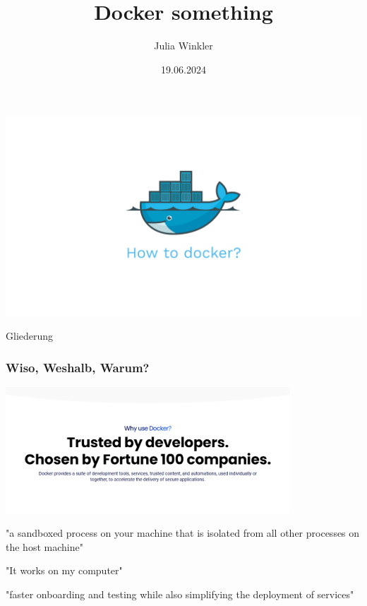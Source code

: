 \documentclass[22pt,handout]{beamer}
\title{Docker something}
\author{Julia Winkler}
\date{19.06.2024}
\begin{document}
\begin{frame}[t]
    \vfill
    \begin{center}
        \includegraphics[width=1\textwidth]{Bilder/docker-how.png}
    \end{center}
    \vfill
\end{frame}

\maketitle

\begin{frame}{Gliederung}
    \tableofcontents
\end{frame}

\begin{frame}
    \frametitle{Wiso, Weshalb, Warum?}
    \begin{center}
        \includegraphics[width=0.8\textwidth]{Bilder/docker-why.png}
    \end{center}\pause
    \begin{center}
        "a sandboxed process on your machine that is isolated from all other processes on the host machine"
    \end{center}\pause
    \begin{center}
        "It works on my computer"
    \end{center}\pause
    \begin{center}
        "faster onboarding and testing while also simplifying the deployment of services"
    \end{center}
\end{frame}
\end{document}
